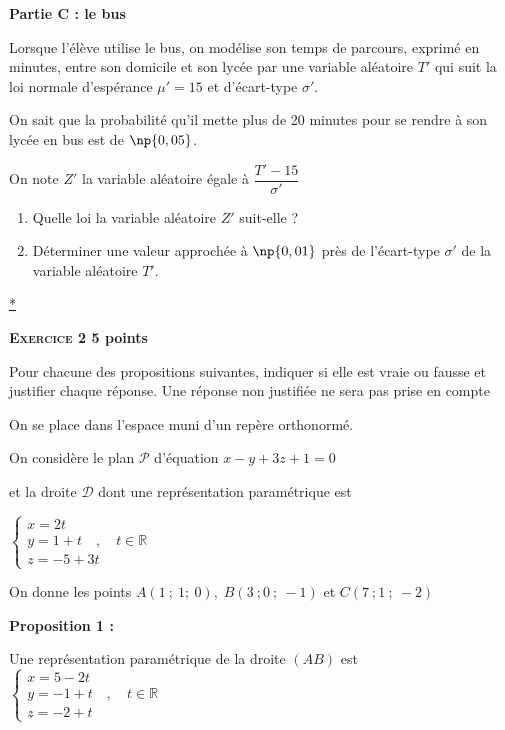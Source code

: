 \documentclass[10pt]{article}
\newcommand{\R}{\mathbb{R}}
\begin{document}
\bigskip

\textbf{Partie C : le bus}

\medskip

Lorsque l'élève utilise le bus, on modélise son temps de parcours, exprimé en minutes, entre son domicile et son lycée par une variable aléatoire $T'$ qui suit la loi normale d'espérance $\mu' = 15$ et d'écart-type $\sigma'$.

On sait que la probabilité qu'il mette plus de 20 minutes pour se rendre à son lycée en bus est de $\np{0,05}$.

On note $Z'$ la variable aléatoire égale à $\dfrac{T'-15}{\sigma'}$

\medskip

\begin{enumerate}
\item Quelle loi la variable aléatoire $Z'$ suit-elle ?
\item Déterminer une valeur approchée à $\np{0,01}$ près de l'écart-type $\sigma'$ de la variable aléatoire $T'$.
\end{enumerate}
\hyperlink{Index}{*}

\newpage

\textbf{\textsc{Exercice 2} \hfill 5 points}

\medskip

Pour chacune des propositions suivantes, indiquer si elle est vraie ou fausse et justifier chaque réponse. Une réponse non justifiée ne sera pas prise en compte
\medskip {}

On se place dans l'espace muni d'un repère orthonormé.

On considère le plan $\mathcal{P}$ d'équation $x - y + 3z + 1 = 0$

et la droite $\mathcal{D}$ dont une représentation paramétrique est
 
$\begin{cases}
x=2t\\
y=1+t\quad,\quad t\in\R \\
z=-5+3t
\end{cases}$

On donne les points $A(1~;~1;~0),\;B(3~;0~;~-1)$ et $C(7~;1~;~-2)$
\medskip

\textbf{Proposition 1 :}

Une représentation paramétrique de la droite $(AB)$ est 
$\begin{cases}
x=5-2t\\
y=-1+t\quad,\quad t\in\R \\
z=-2+t
\end{cases}$
\medskip
\end{document}

